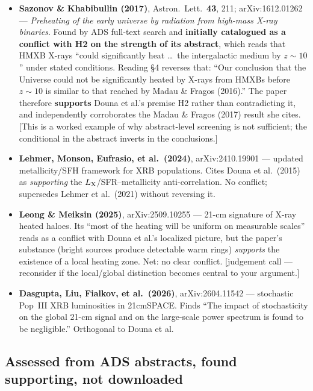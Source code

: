 \documentclass[11pt,a4paper]{article}
\newcommand{\flag}[1]{\textcolor{orange!75!black}{\textsf{\small [#1]}}}
\begin{document}
\begin{itemize}[leftmargin=*,itemsep=3pt]
\item \textbf{Sazonov \& Khabibullin (2017)}, Astron.\ Lett.\ \textbf{43}, 211;
      arXiv:1612.01262 --- \emph{Preheating of the early universe by radiation
      from high-mass X-ray binaries}. Found by ADS full-text search and
      \textbf{initially catalogued as a conflict with H2 on the strength of its
      abstract}, which reads that HMXB X-rays ``could significantly heat
      \dots\ the intergalactic medium by $z\sim10$'' under stated conditions.
      Reading \S4 reverses that: ``Our conclusion that the Universe could not be
      significantly heated by X-rays from HMXBs before $z\sim10$ is similar to
      that reached by Madau \& Fragos (2016).'' The paper therefore
      \textbf{supports} Douna et al.'s premise H2 rather than contradicting it,
      and independently corroborates the Madau \& Fragos (2017) result she
      cites. \flag{This is a worked example of why abstract-level screening is
      not sufficient; the conditional in the abstract inverts in the
      conclusions.}
\item \textbf{Lehmer, Monson, Eufrasio, et al.\ (2024)}, arXiv:2410.19901 ---
      updated metallicity/SFH framework for XRB populations. Cites Douna et al.\
      (2015) as \emph{supporting} the $L_{\rm X}$/SFR--metallicity
      anti-correlation. No conflict; supersedes Lehmer et al.\ (2021) without
      reversing it.
\item \textbf{Leong \& Meiksin (2025)}, arXiv:2509.10255 --- 21-cm signature of
      X-ray heated haloes. Its ``most of the heating will be uniform on
      measurable scales'' reads as a conflict with Douna et al.'s localized
      picture, but the paper's substance (bright sources produce detectable warm
      rings) \emph{supports} the existence of a local heating zone. Net: no
      clear conflict. \flag{judgement call --- reconsider if the local/global
      distinction becomes central to your argument.}
\item \textbf{Dasgupta, Liu, Fialkov, et al.\ (2026)}, arXiv:2604.11542 ---
      stochastic Pop~III XRB luminosities in 21cmSPACE. Finds ``The impact of
      stochasticity on the global 21-cm signal and on the large-scale power
      spectrum is found to be negligible.'' Orthogonal to Douna et al.
\end{itemize}

\subsection*{Assessed from ADS abstracts, found supporting, not downloaded}
\end{document}
